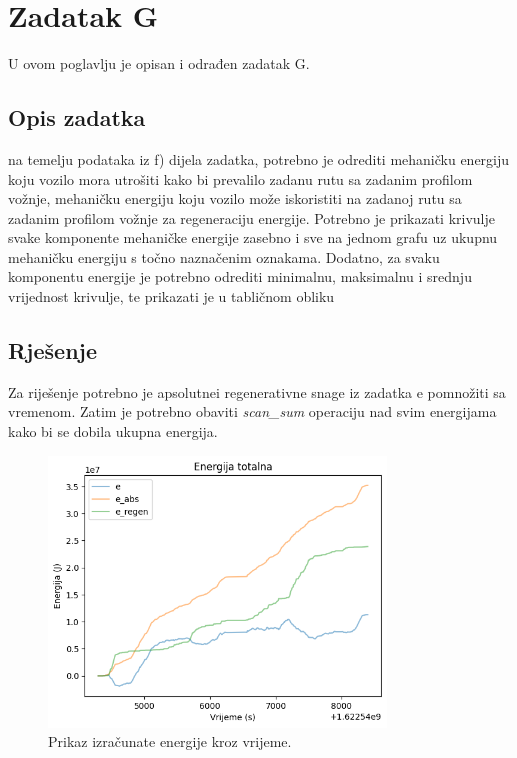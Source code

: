 \chapter{Zadatak G} \label{ch:g}

U ovom poglavlju je opisan i odrađen zadatak G.

\section{Opis zadatka} \label{sec:g:opis}
na temelju podataka iz f) dijela zadatka, potrebno je odrediti mehaničku energiju koju vozilo mora
utrošiti kako bi prevalilo zadanu rutu sa zadanim profilom vožnje, mehaničku energiju koju vozilo
može iskoristiti na zadanoj rutu sa zadanim profilom vožnje za regeneraciju energije. Potrebno je
prikazati krivulje svake komponente mehaničke energije zasebno i sve na jednom grafu uz ukupnu
mehaničku energiju s točno naznačenim oznakama. Dodatno, za svaku komponentu energije je
potrebno odrediti minimalnu, maksimalnu i srednju vrijednost krivulje, te prikazati je u tabličnom
obliku

\section{Rješenje} \label{sec:g:rjesenje}

Za riješenje potrebno je apsolutnei regenerativne snage iz zadatka e pomnožiti sa vremenom.
Zatim je potrebno obaviti \textit{scan\_sum} operaciju nad svim energijama kako bi se dobila
ukupna energija.

\begin{figure}
    \centering
    \includegraphics[width=0.8\textwidth]{images/energies_2.png}
    \caption{Prikaz izračunate energije kroz vrijeme.}
    \label{fig:g:energy_graph}
\end{figure}


